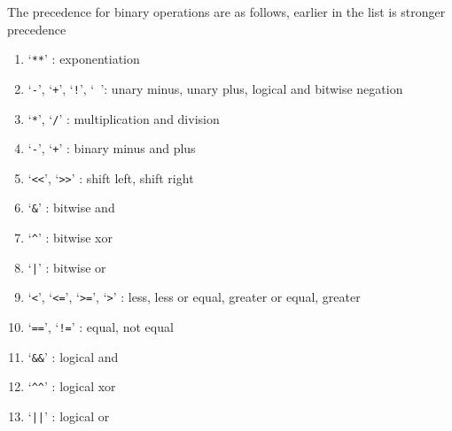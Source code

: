 \documentclass[10pt]{artikel1}
\newcommand{\token}[1]{`\texttt{#1}'}
\begin{document}
The precedence for binary operations are as follows, earlier in the list is stronger precedence \begin{enumerate}
    \item \token{**} : exponentiation
    \item \token{-}, \token{+}, \token{!}, \token{~}: unary minus, unary plus, logical and bitwise negation
    \item \token{*}, \token{/} : multiplication and division
    \item \token{-}, \token{+} : binary minus and plus
    \item \token{<<}, \token{>>} : shift left, shift right
    \item `\verb|&|' : bitwise and
    \item `\verb|^|' : bitwise xor
    \item \token{|} : bitwise or
    \item \token{<}, \token{<=}, \token{>=}, \token{>} : less, less or equal, greater or equal, greater
    \item \token{==}, \token{!=} : equal, not equal
    \item `\verb|&&|' : logical and
    \item `\verb|^^|' : logical xor
    \item \token{||} : logical or
\end{enumerate}
\end{document}
